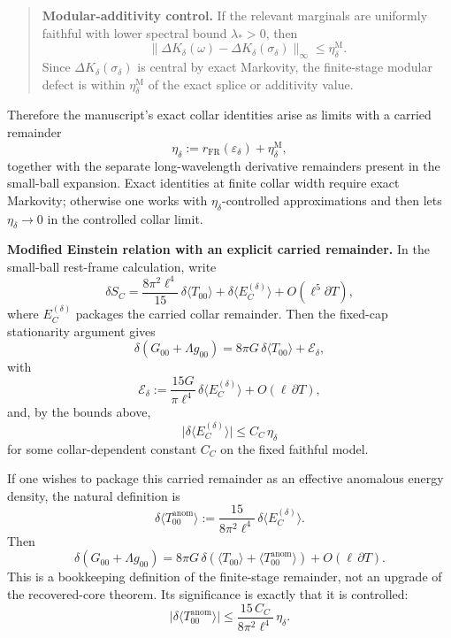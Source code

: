 \begin{quote}
\textbf{Modular-additivity control.} If the relevant marginals are uniformly faithful with lower spectral bound \(\lambda_\ast>0\), then
\[
\|\Delta K_\delta(\omega)-\Delta K_\delta(\sigma_\delta)\|_\infty
\le
\eta_\delta^{\mathrm M}.
\]
Since \(\Delta K_\delta(\sigma_\delta)\) is central by exact Markovity, the finite-stage modular defect is within \(\eta_\delta^{\mathrm M}\) of the exact splice or additivity value.
\end{quote}

Therefore the manuscript's exact collar identities arise as limits with a carried remainder
\[
\eta_\delta
:=
r_{\mathrm{FR}}(\varepsilon_\delta)
+
\eta_\delta^{\mathrm M},
\]
together with the separate long-wavelength derivative remainders present in the small-ball expansion. Exact identities at finite collar width require exact Markovity; otherwise one works with \(\eta_\delta\)-controlled approximations and then lets \(\eta_\delta\to0\) in the controlled collar limit.

\textbf{Modified Einstein relation with an explicit carried remainder.} In the small-ball rest-frame calculation, write
\[
\delta S_C
=
\frac{8\pi^2\ell^4}{15}\,\delta\langle T_{00}\rangle
+
\delta\langle E_C^{(\delta)}\rangle
+
O(\ell^5\partial T),
\]
where \(E_C^{(\delta)}\) packages the carried collar remainder. Then the fixed-cap stationarity argument gives
\[
\delta\!\left(G_{00}+\Lambda g_{00}\right)
=
8\pi G\,\delta\langle T_{00}\rangle
+
\mathcal E_\delta,
\]
with
\[
\mathcal E_\delta
:=
\frac{15G}{\pi\ell^4}\,
\delta\langle E_C^{(\delta)}\rangle
+
O(\ell\,\partial T),
\]
and, by the bounds above,
\[
\bigl|
\delta\langle E_C^{(\delta)}\rangle
\bigr|
\le
C_C\,\eta_\delta
\]
for some collar-dependent constant \(C_C\) on the fixed faithful model.

If one wishes to package this carried remainder as an effective anomalous energy density, the natural definition is
\[
\delta\langle T_{00}^{\mathrm{anom}}\rangle
:=
\frac{15}{8\pi^2\ell^4}\,
\delta\langle E_C^{(\delta)}\rangle.
\]
Then
\[
\delta\!\left(G_{00}+\Lambda g_{00}\right)
=
8\pi G\,
\delta\!\left(
\langle T_{00}\rangle
+
\langle T_{00}^{\mathrm{anom}}\rangle
\right)
+
O(\ell\,\partial T).
\]
This is a bookkeeping definition of the finite-stage remainder, not an upgrade of the recovered-core theorem. Its significance is exactly that it is controlled:
\[
\bigl|
\delta\langle T_{00}^{\mathrm{anom}}\rangle
\bigr|
\le
\frac{15\,C_C}{8\pi^2\ell^4}\,
\eta_\delta.
\]

